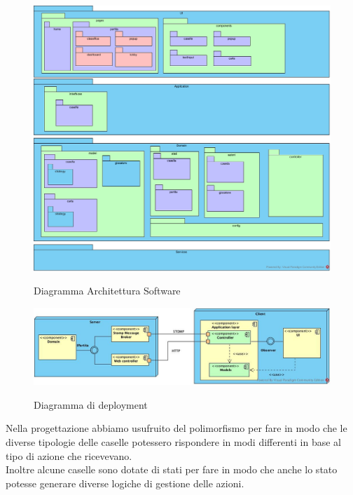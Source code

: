 \documentclass{article}
\begin{document}
\begin{figure}[H]
\centering
\href{https://github.com/UnimibSoftEngCourse2022/progetto-monopoly-1-gangoffour2/blob/feat/doc/doc/img/Diagramma_Architettura_Software.jpg?raw=true}
	{\includegraphics[width=\textwidth]{Diagramma_Architettura_Software}}
\caption{Diagramma Architettura Software}
\end{figure}


\begin{figure}[H]
\centering
\href{https://github.com/UnimibSoftEngCourse2022/progetto-monopoly-1-gangoffour2/blob/feat/doc/doc/img/DiagrammaDiDeployment.jpg?raw=true}
	{\includegraphics[width=\textwidth]{img/DiagrammaDiDeployment.jpg}}
\caption{Diagramma di deployment}
\end{figure}

Nella progettazione abbiamo usufruito del polimorfismo per fare in modo che le diverse tipologie delle caselle potessero rispondere in modi differenti in base al tipo di azione che ricevevano. \\
Inoltre alcune caselle sono dotate di stati per fare in modo che anche lo stato potesse generare diverse logiche di gestione delle azioni.
\end{document}
